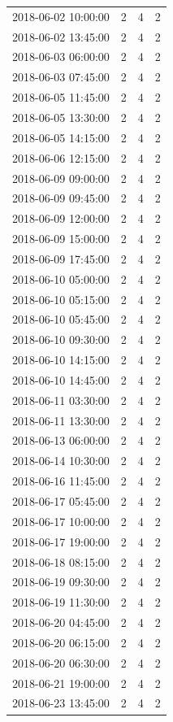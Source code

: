 \begin{tabular}{lrrr}
2018-06-02 10:00:00 & 2 & 4 & 2 \\
2018-06-02 13:45:00 & 2 & 4 & 2 \\
2018-06-03 06:00:00 & 2 & 4 & 2 \\
2018-06-03 07:45:00 & 2 & 4 & 2 \\
2018-06-05 11:45:00 & 2 & 4 & 2 \\
2018-06-05 13:30:00 & 2 & 4 & 2 \\
2018-06-05 14:15:00 & 2 & 4 & 2 \\
2018-06-06 12:15:00 & 2 & 4 & 2 \\
2018-06-09 09:00:00 & 2 & 4 & 2 \\
2018-06-09 09:45:00 & 2 & 4 & 2 \\
2018-06-09 12:00:00 & 2 & 4 & 2 \\
2018-06-09 15:00:00 & 2 & 4 & 2 \\
2018-06-09 17:45:00 & 2 & 4 & 2 \\
2018-06-10 05:00:00 & 2 & 4 & 2 \\
2018-06-10 05:15:00 & 2 & 4 & 2 \\
2018-06-10 05:45:00 & 2 & 4 & 2 \\
2018-06-10 09:30:00 & 2 & 4 & 2 \\
2018-06-10 14:15:00 & 2 & 4 & 2 \\
2018-06-10 14:45:00 & 2 & 4 & 2 \\
2018-06-11 03:30:00 & 2 & 4 & 2 \\
2018-06-11 13:30:00 & 2 & 4 & 2 \\
2018-06-13 06:00:00 & 2 & 4 & 2 \\
2018-06-14 10:30:00 & 2 & 4 & 2 \\
2018-06-16 11:45:00 & 2 & 4 & 2 \\
2018-06-17 05:45:00 & 2 & 4 & 2 \\
2018-06-17 10:00:00 & 2 & 4 & 2 \\
2018-06-17 19:00:00 & 2 & 4 & 2 \\
2018-06-18 08:15:00 & 2 & 4 & 2 \\
2018-06-19 09:30:00 & 2 & 4 & 2 \\
2018-06-19 11:30:00 & 2 & 4 & 2 \\
2018-06-20 04:45:00 & 2 & 4 & 2 \\
2018-06-20 06:15:00 & 2 & 4 & 2 \\
2018-06-20 06:30:00 & 2 & 4 & 2 \\
2018-06-21 19:00:00 & 2 & 4 & 2 \\
2018-06-23 13:45:00 & 2 & 4 & 2 \\

\end{tabular}
